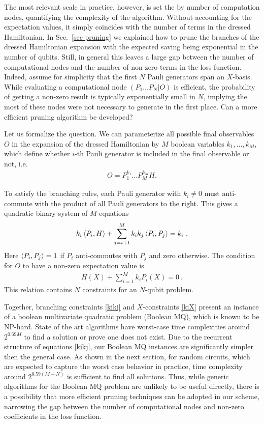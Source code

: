 \documentclass[twocolumn, amsfonts, amssymb, aps, nofootinbib]{revtex4-2}
\begin{document}
The most relevant scale in practice, however, is set the by number of computation nodes, quantifying the complexity of the algorithm. Without accounting for the expectation values, it simply coincides with the number of terms in the dressed Hamiltonian. In Sec.~\ref{sec pruning} we explained how to prune the branches of the dressed Hamiltonian expansion with the expected saving being exponential in the number of qubits. Still, in general this leaves a large gap between the number of computational nodes and the number of non-zero terms in the loss function. Indeed, assume for simplicity that the first $N$ Pauli generators span an $X$-basis. While evaluating a computational node $(P_1\dots P_N|O)$ is efficient, the probability of getting a non-zero result is typically exponentially small in $N$, implying the most of these nodes were not necessary to generate in the first place. Can a more efficient pruning algorithm be developed?

Let us formalize the question. We can parameterize all possible final observables $O$ in the expansion of the dressed Hamiltonian by $M$ boolean variables $k_1,\dots, k_M$, which define whether $i$-th Pauli generator is included in the final observable or not, i.e. 
\begin{align}
	O=P_1^{k_1}\dots P_M^{k_M}H  .
\end{align}

To satisfy the branching rules, each Pauli generator with $k_i\neq 0$ must anti-commute with the product of all Pauli generators to the right. This gives a quadratic binary system of $M$ equations 
\begin{align}
	k_i\braket{P_i, H}+\sum_{j=i+1}^M k_ik_j \braket{P_i, P_j}=k_i \ . \label{kikj}
\end{align}
Here $\braket{P_i, P_j}=1$ if $P_i$ anti-commutes with $P_j$ and zero otherwise. The condition for $O$ to have a non-zero expectation value is 
\begin{align}
	H(X)+\sum_{i=1}^M k_i P_i(X)=0 \ . \label{kiX}
\end{align}
This relation contains $N$ constraints for an $N$-qubit problem.

Together, branching constraints \eqref{kikj} and $X$-constraints \eqref{kiX} present an instance of a boolean multivariate quadratic problem (Boolean MQ), which is known to be NP-hard. State of the art algorithms \cite{Dinur2020, Barbero2022} have worst-case time complexities around $2^{0.69M}$ to find a solution or prove one does not exist. Due to the recurrent structure of equations \eqref{kikj}, our Boolean MQ instances are significantly simpler then the general case. As shown in the next section, for random circuits, which are expected to capture the worst case behavior in practice, time complexity around $2^{0.59(M-N)}$ is sufficient to find all solutions. Thus, while generic algorithms for the Boolean MQ problem are unlikely to be useful directly, there is a possibility that more efficient pruning techniques can be adopted in our scheme, narrowing the gap between the number of computational nodes and non-zero coefficients in the loss function.
\end{document}
